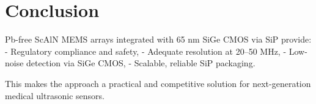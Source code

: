 \documentclass[conference]{IEEEtran}
\begin{document}
\section{Conclusion}
Pb-free ScAlN MEMS arrays integrated with 65 nm SiGe CMOS via SiP provide:
- Regulatory compliance and safety,  
- Adequate resolution at 20--50 MHz,  
- Low-noise detection via SiGe CMOS,  
- Scalable, reliable SiP packaging.  

This makes the approach a practical and competitive solution for next-generation medical ultrasonic sensors.



\end{document}
